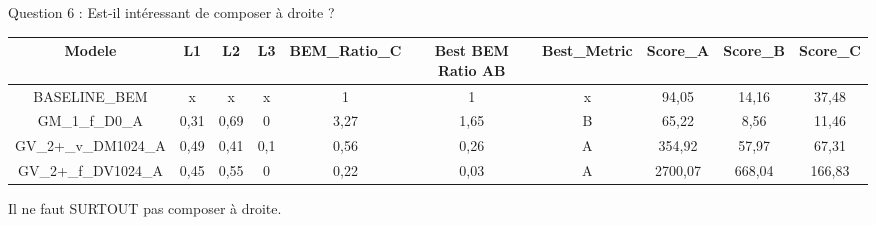 \documentclass[
11pt,notheorems,hyperref={pdfauthor=whatever}
]{beamer}
\begin{document}
\begin{frame}{Question 6 : Est-il intéressant de composer à droite ?}
    \begin{center}
        \tiny
        \begin{tabular}{|c|c|c|c|c|c|c|c|c|c|}
                \hline
                Modele & L1 & L2 & L3 & BEM\_Ratio\_C & Best BEM Ratio AB & Best\_Metric & Score\_A & Score\_B & Score\_C   \\
                \hline
                BASELINE\_BEM           & x     & x      & x    &  1   & 1     & x    & 94,05  & 14,16 & 37,48      \\
                GM\_1\_f\_D0\_A         & 0,31  & 0,69   & 0    &3,27  & 1,65  & B    & 65,22  & 8,56  & 11,46      \\                           
                GV\_2+\_v\_DM1024\_A    & 0,49	& 0,41   &0,1   &0,56  &0,26   & A    & 354,92 & 57,97 & 67,31      \\
                GV\_2+\_f\_DV1024\_A    & 0,45  & 0,55   &0     &0,22  &0,03   & A    & 2700,07&668,04 & 166,83     \\        
                \hline
        \end{tabular}
    \end{center}

    \vspace{0.3cm}

    Il ne faut SURTOUT pas composer à droite.
\end{frame}
\end{document}
